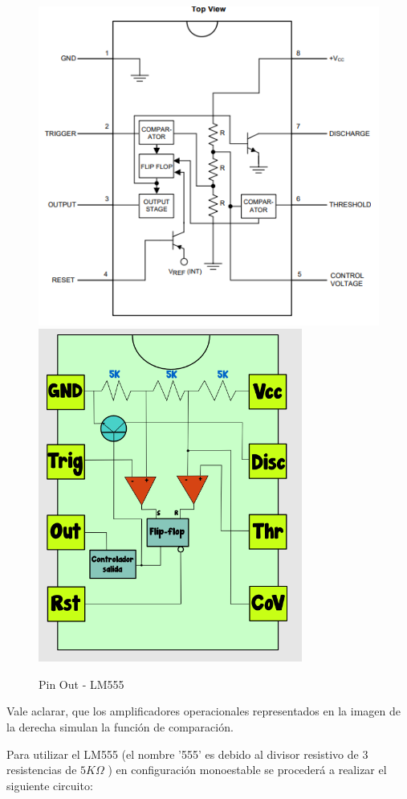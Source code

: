 \begin{figure}[H]
\centering
\includegraphics[scale=0.5]{pinOutLM55(a).PNG}
\qquad
\includegraphics[scale=0.5]{pinOutLM55(b).PNG}
\caption{Pin Out - LM555}
\end{figure}

Vale aclarar, que los amplificadores operacionales representados en
la imagen de la derecha simulan la función de comparación.

Para utilizar el LM555 (el nombre '555' es debido al divisor resistivo
de 3 resistencias de $5K\Omega$ ) en configuración monoestable se
procederá a realizar el siguiente circuito:

